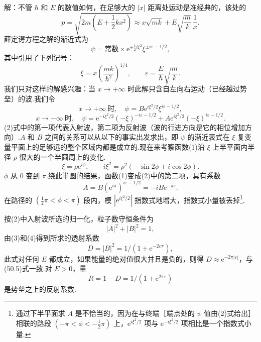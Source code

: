 \begin{xiti}
解：不管 $\hbar$ 和 $E$ 的数值如何，在足够大的 $|x|$ 距离处运动是准经典的，该处的
\begin{equation*}
  p=\sqrt{2m\left(E+\frac{1}{2}kx^2\right)}
  \approx x\sqrt{mk}+E\sqrt{\frac{m}{k}}\,\frac{1}{x}.
\end{equation*}
薛定谔方程之解的渐近式为
\begin{equation*}
  \psi=\text{常数}\times\mathrm{e}^{\pm\frac{1}{2}i\xi^2}\xi^{\pm i\varepsilon-1/2},
\end{equation*}
其中引用了下列记号：
\begin{equation*}
  \xi=x\left(\frac{mk}{\hbar^2}\right)^{1/4},\qquad
  \varepsilon=\frac{E}{\hbar}\sqrt{\frac{m}{k}}.
\end{equation*}
我们只对这样的解感兴趣：当 $x\to+\infty$ 时此解只含自左向右运动（已经越过势垒）的波.我们令
\setcounter{equation}{0}%
\begin{equation}
  x\to+\infty\ \text{时},\quad
  \psi=B\mathrm{e}^{i\xi^2/2}\xi^{i\varepsilon-1/2},
\end{equation}
\begin{equation}
  x\to-\infty\ \text{时},\quad
  \psi=\mathrm{e}^{-i\xi^2/2}(-\xi)^{-i\varepsilon-1/2}
  +A\mathrm{e}^{i\xi^2/2}(-\xi)^{i\varepsilon-1/2}.
\end{equation}
(2)式中的第一项代表入射波，第二项为反射波（波的行进方向是它的相位增加方向）.$A$ 和 $B$ 之间的关系可以从以下的事实出发求出，即 $\psi$ 的渐近表式在 $\xi$ 复变量平面上的足够远的整个区域内都是成立的.现在来考察函数(1)沿 $\xi$ 上半平面内半径 $\rho$ 很大的一个半圆周上的变化.
\begin{equation*}
  \xi=\rho\mathrm{e}^{i\phi},\qquad
  i\xi^2=\rho^2(-\sin2\phi+i\cos2\phi).
\end{equation*}
$\phi$ 从 0 变到 $\pi$.绕此半圆的结果，函数(1)变成(2)中的第二项，具有系数
\begin{equation}
  A=B(\mathrm{e}^{i\pi})^{i\varepsilon-1/2}=-iB\mathrm{e}^{-\pi\varepsilon}.
\end{equation}
在路径的 $\left(\frac{1}{2}\pi<\phi<\pi\right)$ 段内，模 $|\mathrm{e}^{i\xi^2/2}|$ 指数式地增大，指数式小量被丢掉\footnote{通过下半平面求 $A$ 是不恰当的，因为在与终端［端点处的 $\psi$ 值由(2)式给出］相联的路段 $\left(-\pi<\phi<-\frac{1}{2}\pi\right)$ 上，$\mathrm{e}^{i\xi^2/2}$ 项与 $\mathrm{e}^{-i\xi^2/2}$ 项相比是一个指数式小量.}.

按(2)中入射波所选的归一化，粒子数守恒条件为
\begin{equation}
  |A|^2+|B|^2=1,
\end{equation}
由(3)和(4)得到所求的透射系数
\begin{equation*}
  D=|B|^2=1/(1+\mathrm{e}^{-2\varepsilon\pi}),
\end{equation*}
此式对任何 $E$ 都成立，如果能量的绝对值很大并且是负的，则得 $D\approx\mathrm{e}^{-2\pi|\varepsilon|}$，与(50.5)式一致.对 $E>0$，量
\begin{equation*}
  R=1-D=1/(1+\mathrm{e}^{2\pi\varepsilon})
\end{equation*}
是势垒之上的反射系数.

\end{xiti}
\renewcommand{\theequation}{\arabic{section}.\arabic{equation}}%

